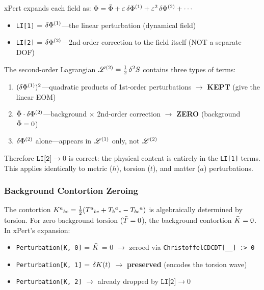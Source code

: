xPert expands each field as: $\Phi = \bar{\Phi} + \varepsilon\,\delta \Phi^{(1)} + \varepsilon^2\,\delta \Phi^{(2)} + \cdots$
\begin{itemize}
  \item \texttt{LI[1]} = $\delta \Phi^{(1)}$---the linear perturbation (dynamical field)
  \item \texttt{LI[2]} = $\delta \Phi^{(2)}$---2nd-order correction to the field itself (NOT a separate DOF)
\end{itemize}

The second-order Lagrangian $\mathscr{L}^{(2)} = \tfrac{1}{2}\,\delta^2 S$ contains three types of terms:
\begin{enumerate}
  \item $(\delta \Phi^{(1)})^2$---quadratic products of 1st-order perturbations $\to$ \textbf{KEPT} (give the linear EOM)
  \item $\bar{\Phi} \cdot \delta \Phi^{(2)}$---background $\times$ 2nd-order correction $\to$ \textbf{ZERO} (background $\bar{\Phi} = 0$)
  \item $\delta \Phi^{(2)}$ alone---appears in $\mathscr{L}^{(1)}$ only, not $\mathscr{L}^{(2)}$
\end{enumerate}

Therefore $\texttt{LI[2]} \to 0$ is correct: the physical content is entirely in the \texttt{LI[1]} terms.
This applies identically to metric ($h$), torsion ($t$), and matter ($a$) perturbations.

\subsubsection{Background Contortion Zeroing}
\label{sec:contortion-zeroing}

The contortion $K^a{}_{bc} = \tfrac{1}{2}(T^a{}_{bc} + T_b{}^a{}_c - T_{bc}{}^a)$ is algebraically determined by torsion. For zero background torsion ($\bar{T} = 0$), the background contortion $\bar{K} = 0$. In xPert's expansion:
\begin{itemize}
  \item \texttt{Perturbation[K, 0]} = $\bar{K}$ = 0 $\to$ zeroed via \texttt{ChristoffelCDCDT[\_\_] :> 0}
  \item \texttt{Perturbation[K, 1]} = $\delta K(t)$ $\to$ \textbf{preserved} (encodes the torsion wave)
  \item \texttt{Perturbation[K, 2]} $\to$ already dropped by $\texttt{LI[2]} \to 0$
\end{itemize}


